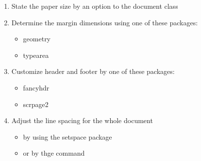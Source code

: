 \documentclass{article}
\begin{document}
    \begin{enumerate}
        \item State the paper size by an option to the document class
        \item Determine the margin dimensions using one of these packages:
        \begin{itemize}
            \item geometry
            \item typearea
        \end{itemize}
        \item Customize header and footer by one of these packages:
        \begin{itemize}
            \item fancyhdr
            \item scrpage2
        \end{itemize}
        \item Adjust the line spacing for the whole document
        \begin{itemize}
            \item by using the setspace package
            \item or by thge command \linespread{factor}
        \end{itemize}
    \end{enumerate}
\end{document}
